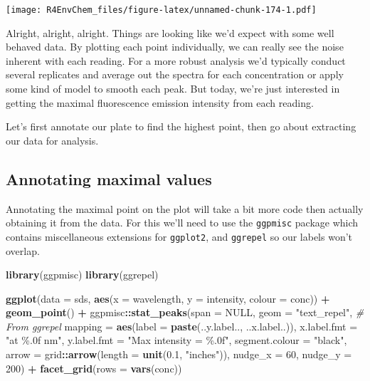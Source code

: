 \documentclass[
]{book}
\newenvironment{Shaded}{\begin{snugshade}}{\end{snugshade}}
\newcommand{\AttributeTok}[1]{\textcolor[rgb]{0.13,0.29,0.53}{#1}}
\newcommand{\CommentTok}[1]{\textcolor[rgb]{0.56,0.35,0.01}{\textit{#1}}}
\newcommand{\ConstantTok}[1]{\textcolor[rgb]{0.56,0.35,0.01}{#1}}
\newcommand{\DecValTok}[1]{\textcolor[rgb]{0.00,0.00,0.81}{#1}}
\newcommand{\FloatTok}[1]{\textcolor[rgb]{0.00,0.00,0.81}{#1}}
\newcommand{\FunctionTok}[1]{\textcolor[rgb]{0.13,0.29,0.53}{\textbf{#1}}}
\newcommand{\NormalTok}[1]{#1}
\newcommand{\SpecialCharTok}[1]{\textcolor[rgb]{0.81,0.36,0.00}{\textbf{#1}}}
\newcommand{\StringTok}[1]{\textcolor[rgb]{0.31,0.60,0.02}{#1}}
\begin{document}
\texttt{[image: R4EnvChem\_files/figure-latex/unnamed-chunk-174-1.pdf]}

Alright, alright, alright. Things are looking like we'd expect with some well behaved data. By plotting each point individually, we can really see the noise inherent with each reading. For a more robust analysis we'd typically conduct several replicates and average out the spectra for each concentration or apply some kind of model to smooth each peak. But today, we're just interested in getting the maximal fluorescence emission intensity from each reading.

Let's first annotate our plate to find the highest point, then go about extracting our data for analysis.

\hypertarget{annotating-maximal-values}{%
\subsection{Annotating maximal values}\label{annotating-maximal-values}}

Annotating the maximal point on the plot will take a bit more code then actually obtaining it from the data. For this we'll need to use the \texttt{ggpmisc} package which contains miscellaneous extensions for \texttt{ggplot2}, and \texttt{ggrepel} so our labels won't overlap.

\begin{Shaded}
\begin{Highlighting}[]
\FunctionTok{library}\NormalTok{(ggpmisc)}
\FunctionTok{library}\NormalTok{(ggrepel)}

\FunctionTok{ggplot}\NormalTok{(}\AttributeTok{data =}\NormalTok{ sds, }
       \FunctionTok{aes}\NormalTok{(}\AttributeTok{x =}\NormalTok{ wavelength,}
           \AttributeTok{y =}\NormalTok{ intensity, }
           \AttributeTok{colour =}\NormalTok{ conc)) }\SpecialCharTok{+}
  \FunctionTok{geom\_point}\NormalTok{() }\SpecialCharTok{+}
\NormalTok{  ggpmisc}\SpecialCharTok{::}\FunctionTok{stat\_peaks}\NormalTok{(}\AttributeTok{span =} \ConstantTok{NULL}\NormalTok{,}
                      \AttributeTok{geom =} \StringTok{"text\_repel"}\NormalTok{, }\CommentTok{\# From ggrepel}
                      \AttributeTok{mapping =} \FunctionTok{aes}\NormalTok{(}\AttributeTok{label =} \FunctionTok{paste}\NormalTok{(..y.label.., ..x.label..)),}
                      \AttributeTok{x.label.fmt =} \StringTok{"at \%.0f nm"}\NormalTok{,}
                      \AttributeTok{y.label.fmt =} \StringTok{"Max intensity = \%.0f"}\NormalTok{,}
                      \AttributeTok{segment.colour =} \StringTok{"black"}\NormalTok{,}
                      \AttributeTok{arrow =}\NormalTok{ grid}\SpecialCharTok{::}\FunctionTok{arrow}\NormalTok{(}\AttributeTok{length =} \FunctionTok{unit}\NormalTok{(}\FloatTok{0.1}\NormalTok{, }\StringTok{"inches"}\NormalTok{)),}
                      \AttributeTok{nudge\_x =} \DecValTok{60}\NormalTok{,}
                      \AttributeTok{nudge\_y =} \DecValTok{200}\NormalTok{) }\SpecialCharTok{+}
  \FunctionTok{facet\_grid}\NormalTok{(}\AttributeTok{rows =} \FunctionTok{vars}\NormalTok{(conc))}
\end{Highlighting}
\end{Shaded}
\end{document}
